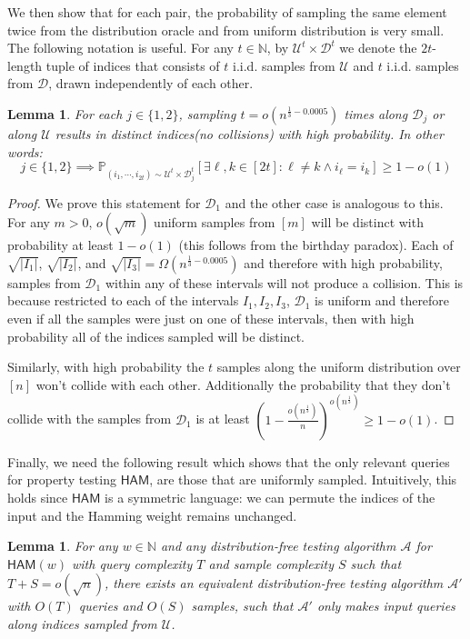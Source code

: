 \documentclass[11pt]{article}
\newtheorem{lemma}[theorem]{Lemma}
\newcommand{\HAM}{\mathsf{HAM}}
\newcommand{\N}{\mathbb{N}}
\newcommand{\sU}{\mathcal{U}}
\newcommand{\sD}{\mathcal{D}}
\newcommand{\sA}{\mathcal{A}}
\begin{document}
We then show that for each pair, the probability of sampling the same element twice from the distribution oracle and from uniform distribution is very small. The following notation is useful. For any $t\in \N$, by $\sU^t \times \sD^t$ we denote the $2t$-length tuple of indices that consists of $t$ i.i.d. samples from $\sU$ and $t$ i.i.d. samples from $\sD$, drawn independently of each other.

\begin{lemma}\label{colls}
For each $j\in \{1,2\}$, sampling $t=o(n^{\frac{1}{3}-0.0005})$ times along $\mathcal{D}_{j}$ or along $\sU$ results in distinct indices(no collisions) with high probability. In other words:
\begin{equation}
    j\in\{1,2\}\implies\mathbb{P}_{(i_{1},\cdots, i_{2t})\sim\sU^{t}\times\mathcal{D}_{j}^{t}} \left[ \exists \ell,k\in [2t]:\ell\neq k\wedge i_{\ell}=i_{k} \right] \geq 1-o(1)
\end{equation}
\end{lemma}

\begin{proof}
We prove this statement for $\sD_1$ and the other case is analogous to this. For any $m>0$, $o(\sqrt{m})$ uniform samples from $[m]$ will be distinct with probability at least $1-o(1)$ (this follows from the birthday paradox). Each of $\sqrt{|I_{1}|}$, $\sqrt{|I_{2}|}$, and $\sqrt{|I_{3}|}=\Omega(n^{\frac{1}{3}-0.0005})$ and therefore with high probability, samples from $\sD_1$ within any of these intervals will not produce a collision. This is because restricted to each of the intervals $I_{1}, I_{2}, I_{3}$, $\mathcal{D}_{1}$ is uniform and therefore even if all the samples were just on one of these intervals, then with high probability all of the indices sampled will be distinct. 

Similarly, with high probability the $t$ samples along the uniform distribution over $[n]$ won't collide with each other. Additionally the probability that they don't collide with the samples from $\sD_1$ is at least $\left (1-\frac{o(n^{\frac{1}{3}})}{n}\right)^{o(n^{\frac{1}{3}})} \geq 1-o(1)$.
\end{proof}

Finally, we need the following result which shows that the only relevant queries for property testing $\HAM$, are those that are uniformly sampled. Intuitively, this holds since $\HAM$ is a symmetric language: we can permute the indices of the input and the Hamming weight remains unchanged. 

\begin{lemma}\label{lem:PTSamplingHam}
For any $w\in \mathbb{N}$ and any distribution-free testing algorithm $\sA$ for $\HAM(w)$ with query complexity $T$ and sample complexity $S$ such that $T + S = o(\sqrt{n})$, there exists an equivalent distribution-free testing algorithm $\sA'$ with $O(T)$ queries and $O(S)$ samples, such that $\sA'$ only makes input queries along indices sampled from $\mathcal{U}$.
\end{lemma}
\end{document}
